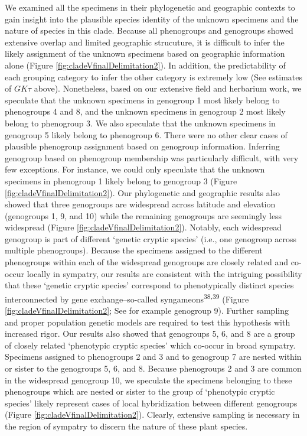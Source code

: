 \documentclass[
  11pt,
]{article}
\begin{document}
We examined all the specimens in their phylogenetic and geographic contexts to gain insight into the plausible species identity of the unknown specimens and the nature of species in this clade. Because all phenogroups and genogroups showed extensive overlap and limited geographic strucuture, it is difficult to infer the likely assignment of the unknown specimens based on geographic information alone (Figure \ref{fig:cladeVfinalDelimitation2}). In addition, the predictability of each grouping category to infer the other category is extremely low (See estimates of \(GK\tau\) above). Nonetheless, based on our extensive field and herbarium work, we speculate that the unknown specimens in genogroup 1 most likely belong to phenogroups 4 and 8, and the unknown specimens in genogroup 2 most likely belong to phenogroup 3. We also speculate that the unknown specimens in genogroup 5 likely belong to phenogroup 6. There were no other clear cases of plausible phenogroup assignment based on genogroup information. Inferring genogroup based on phenogroup membership was particularly difficult, with very few exceptions. For instance, we could only speculate that the unknown specimens in phenogroup 1 likely belong to genogroup 3 (Figure \ref{fig:cladeVfinalDelimitation2}). Our phylogenetic and geographic results also showed that three genogroups are widespread across latitude and elevation (genogroups 1, 9, and 10) while the remaining genogroups are seemingly less widespread (Figure \ref{fig:cladeVfinalDelimitation2}). Notably, each widespread genogroup is part of different `genetic cryptic species' (i.e., one genogroup across multiple phenogroups). Because the specimens assigned to the different phenogroups within each of the widespread genogroups are closely related and co-occur locally in sympatry, our results are consistent with the intriguing possibility that these `genetic cryptic species' correspond to phenotypically distinct species interconnected by gene exchange--so-called syngameons\textsuperscript{38,39} (Figure \ref{fig:cladeVfinalDelimitation2}; See for example genogroup 9). Further sampling and proper population genetic models are required to test this hypothesis with increased rigor. Our results also showed that genogroups 5, 6, and 8 are a group of closely related `phenotypic cryptic species' which co-occur in broad sympatry. Specimens assigned to phenogroups 2 and 3 and to genogroup 7 are nested within or sister to the genogroups 5, 6, and 8. Because phenogroups 2 and 3 are common in the widespread genogroup 10, we speculate the specimens belonging to these phenogroups which are nested or sister to the group of `phenotypic cryptic species' likely represent cases of local hybridization between different genogroups (Figure \ref{fig:cladeVfinalDelimitation2}). Clearly, extensive sampling is necessary in the region of sympatry to discern the nature of these plant species.
\end{document}
